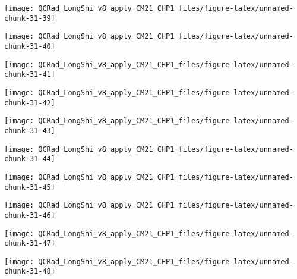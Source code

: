 \documentclass[
  10pt,
  a4paper,oneside]{article}
\begin{document}
\begin{center}\texttt{[image: QCRad\_LongShi\_v8\_apply\_CM21\_CHP1\_files/figure-latex/unnamed-chunk-31-39]} \end{center}

\begin{center}\texttt{[image: QCRad\_LongShi\_v8\_apply\_CM21\_CHP1\_files/figure-latex/unnamed-chunk-31-40]} \end{center}

\begin{center}\texttt{[image: QCRad\_LongShi\_v8\_apply\_CM21\_CHP1\_files/figure-latex/unnamed-chunk-31-41]} \end{center}

\begin{center}\texttt{[image: QCRad\_LongShi\_v8\_apply\_CM21\_CHP1\_files/figure-latex/unnamed-chunk-31-42]} \end{center}

\begin{center}\texttt{[image: QCRad\_LongShi\_v8\_apply\_CM21\_CHP1\_files/figure-latex/unnamed-chunk-31-43]} \end{center}

\begin{center}\texttt{[image: QCRad\_LongShi\_v8\_apply\_CM21\_CHP1\_files/figure-latex/unnamed-chunk-31-44]} \end{center}

\begin{center}\texttt{[image: QCRad\_LongShi\_v8\_apply\_CM21\_CHP1\_files/figure-latex/unnamed-chunk-31-45]} \end{center}

\begin{center}\texttt{[image: QCRad\_LongShi\_v8\_apply\_CM21\_CHP1\_files/figure-latex/unnamed-chunk-31-46]} \end{center}

\begin{center}\texttt{[image: QCRad\_LongShi\_v8\_apply\_CM21\_CHP1\_files/figure-latex/unnamed-chunk-31-47]} \end{center}

\begin{center}\texttt{[image: QCRad\_LongShi\_v8\_apply\_CM21\_CHP1\_files/figure-latex/unnamed-chunk-31-48]} \end{center}
\end{document}
